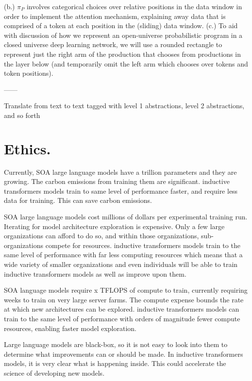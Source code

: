 (b.) $\pi_P$ involves categorical choices over relative positions in the data window in order to implement the attention mechanism, explaining away data that is comprised of a token at each position in the (sliding) data window. (c.) To aid with discussion of how we represent an open-universe probabilistic program in a closed universe deep learning network, we will use a rounded rectangle to represent just the right arm of the production that chooses from productions in the layer below (and temporarily omit the left arm which chooses over tokens and token positions).

------

Translate from text to text tagged with level 1 abstractions, level 2 abstractions, and so forth







\section{Ethics.} Currently, SOA large language models have a trillion parameters and they are growing.  The carbon emissions from training them are significant.  inductive transformers models train to same level of performance faster, and require less data for training.  This can save carbon emissions.


SOA large language models cost millions of dollars per experimental training run.  Iterating for model architecture exploration is expensive.  Only a few large organizations can afford to do so, and within those organizations, sub-organizations compete for resources.  inductive transformers models train to the same level of performance with far less computing resources which means that a wide variety of smaller organizations and even individuals will be able to train inductive transformers models as well as improve upon them.

SOA language models require x TFLOPS of compute to train, currently requiring weeks to train on very large server farms.  The compute expense bounds the rate at which new architectures can be explored.  inductive transformers models can train to the same level of performance with orders of magnitude fewer compute resources, enabling faster model exploration.

Large language models are black-box, so it is not easy to look into them to determine what improvements can or should be made.  In inductive transformers models, it is very clear what is happening inside.  This could accelerate the science of developing new models.


